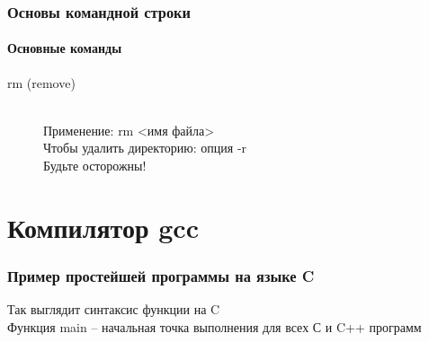 \documentclass[12pt,pdf,hyperref={unicode}]{beamer}
\begin{document}
\begin{frame}
\frametitle{Основы командной строки} 
\framesubtitle{Основные команды}
\begin{description}
  \item[rm (remove)] \hfill \\
  Применение: rm <имя файла> \\
  Чтобы удалить директорию: опция -r\\
  Будьте осторожны!
\end{description}
\end{frame}

\section{Компилятор gcc}


\begin{frame}
\frametitle{Пример простейшей программы на языке C}



Так выглядит синтаксис функции на C \\
Функция main -- начальная точка выполнения для всех С и C++ программ

\end{frame}
\end{document}
